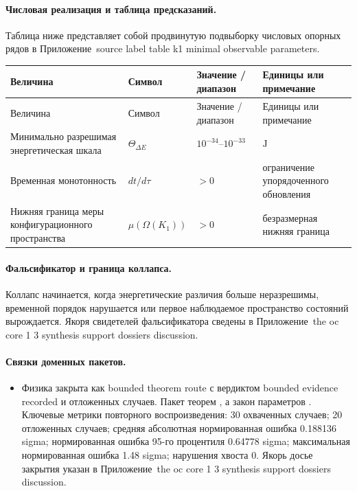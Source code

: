 \paragraph{Числовая реализация и таблица предсказаний.}
Таблица ниже представляет собой продвинутую подвыборку числовых опорных рядов в Приложение~source label table k1 minimal observable parameters.
\begin{longtable}{@{}L{0.27\textwidth}L{0.15\textwidth}L{0.24\textwidth}L{0.16\textwidth}@{}}
\toprule
Величина & Символ & Значение / диапазон & Единицы или примечание \\
\midrule
\endfirsthead
\toprule
Величина & Символ & Значение / диапазон & Единицы или примечание \\
\midrule
\endhead
Минимально разрешимая энергетическая шкала & $\scriptstyle \Theta_{\Delta E}$ & $10^{-34}\text{--}10^{-33}$ & $\mathrm{J}$ \\
Временная монотонность & $\scriptstyle dt/\allowbreak d\tau$ & $> 0$ & ограничение упорядоченного обновления \\
Нижняя граница меры конфигурационного пространства & $\scriptstyle \mu(\Omega(K_1))$ & $> 0$ & безразмерная нижняя граница \\
\bottomrule
\end{longtable}

\paragraph{Фальсификатор и граница коллапса.}
Коллапс начинается, когда энергетические различия больше неразрешимы, временной порядок нарушается или первое наблюдаемое пространство состояний вырождается.
Якоря свидетелей фальсификатора сведены в Приложение~the oc core 1 3 synthesis support dossiers discussion.

\paragraph{Связки доменных пакетов.}
\begin{itemize}[leftmargin=1.6em,nosep]
\item Физика закрыта как bounded theorem route с вердиктом bounded evidence recorded и  отложенных случаев. Пакет теорем , а закон параметров . Ключевые метрики повторного воспроизведения: 30 охваченных случаев; 20 отложенных случаев; средняя абсолютная нормированная ошибка 0.188136 sigma; нормированная ошибка 95-го процентиля 0.64778 sigma; максимальная нормированная ошибка 1.48 sigma; нарушения хвоста 0. Якорь досье закрытия указан в Приложение~the oc core 1 3 synthesis support dossiers discussion.
\end{itemize}

